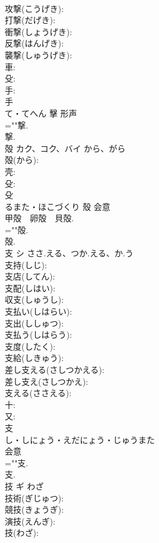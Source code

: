 \documentclass[8pt]{extreport}
\begin{document}
\begin{CJK}{UTF8}{min}
\\	攻撃(こうげき): 
\\	打撃(だげき): 
\\	衝撃(しょうげき): 
\\	反撃(はんげき): 
\\	襲撃(しゅうげき): 
\\	車: 
\\	殳: 
\\	手: 
\\	手	
\\	て・てへん	擊	形声 
\\	=""撃.
\\	撃.
\\	殻	カク、コク、バイ	から、がら		
\\	殻(から): 
\\	壳: 
\\	殳: 
\\	殳	
\\	るまた・ほこづくり	殼	会意 
\\	甲殻　卵殻　貝殻.	
\\	=""殻.
\\	殻.
\\	支	シ	ささ.える、つか.える、か.う		
\\	支持(しじ): 
\\	支店(してん): 
\\	支配(しはい): 
\\	収支(しゅうし): 
\\	支払い(しはらい): 
\\	支出(ししゅつ): 
\\	支払う(しはらう): 
\\	支度(したく): 
\\	支給(しきゅう): 
\\	差し支える(さしつかえる): 
\\	差し支え(さしつかえ): 
\\	支える(ささえる): 
\\	十: 
\\	又: 
\\	支	
\\	し・しにょう・えだにょう・じゅうまた	
\\	会意 
\\	=""支.
\\	支.
\\	技	ギ	わざ		
\\	技術(ぎじゅつ): 
\\	競技(きょうぎ): 
\\	演技(えんぎ): 
\\	技(わざ): 

\end{CJK}
\end{document}
